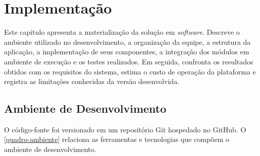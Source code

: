 \chapter{Implementação}\label{cap:implementacao}

Este capítulo apresenta a materialização da solução em \textit{software}. Descreve o ambiente utilizado no desenvolvimento, a organização da equipe, a estrutura da aplicação, a implementação de seus componentes, a integração dos módulos em ambiente de execução e os testes realizados. Em seguida, confronta os resultados obtidos com os requisitos do sistema, estima o custo de operação da plataforma e registra as limitações conhecidas da versão desenvolvida.

\section{Ambiente de Desenvolvimento}

O código-fonte foi versionado em um repositório Git hospedado no GitHub. O \autoref{quadro-ambiente} relaciona as ferramentas e tecnologias que compõem o ambiente de desenvolvimento.

